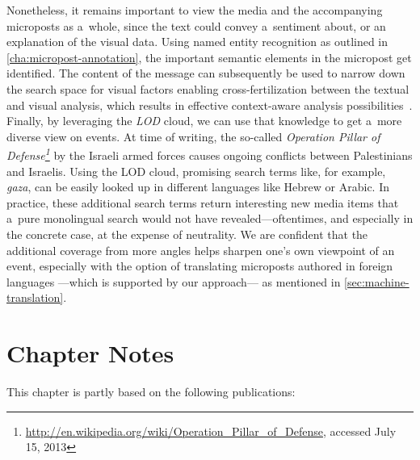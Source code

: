 Nonetheless, it remains important to view the media and the
accompanying microposts as a~whole, since the text
could convey a~sentiment about,
or an explanation of the visual data.
Using named entity recognition as outlined in
\autoref{cha:micropost-annotation},
the important semantic elements in the micropost get identified. 
The content of the message can subsequently be used
to narrow down the search space for visual factors
enabling cross-fertilization between the textual
and visual analysis, which results in effective context-aware analysis possibilities~\cite{verborgh2012multimediaannotation,rizzo2012whatfresh}.
Finally, by leveraging the \emph{LOD} cloud,
we can use that knowledge to get a~more diverse view on events.
At time of writing, the so-called
\emph{Operation Pillar of
Defense\footnote{\url{http://en.wikipedia.org/wiki/Operation_Pillar_of_Defense}, accessed July 15, 2013}}
by the Israeli armed forces
causes ongoing conflicts between Palestinians and Israelis.
Using the LOD cloud, promising search terms like, for example,
\emph{gaza}, can be easily looked up in different languages
like Hebrew or Arabic.
In practice, these additional search terms return interesting
new media items that a~pure monolingual search
would not have revealed---oftentimes,
and especially in the concrete case,
at the expense of neutrality.
We are confident that the additional coverage
from more angles helps sharpen one's own viewpoint of an event,
especially with the option of translating microposts
authored in foreign languages%
---which is supported by our approach---%
as mentioned in \autoref{sec:machine-translation}.

\section*{Chapter Notes}
This chapter is partly based on the following publications:


\clearpage

